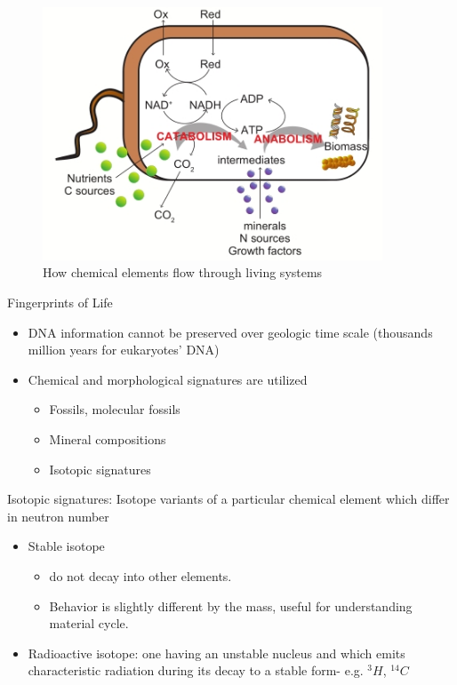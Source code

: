 \documentclass[]{article}
\begin{document}
\begin{figure}[H]
	\caption{How chemical elements flow through living systems}\label{fig:Biogeochemistry}
	\includegraphics[width=0.9\textwidth]{Biogeochemistry}
\end{figure}

Fingerprints of Life
\begin{itemize}
	\item  DNA information cannot be preserved over geologic time
	scale (thousands ~ million years for eukaryotes' DNA)
	\item Chemical and morphological signatures are utilized
	\begin{itemize}
		\item  Fossils, molecular fossils
		\item Mineral compositions
		\item Isotopic signatures
	\end{itemize}
\end{itemize}

Isotopic signatures: Isotope variants of a particular chemical element
which differ in neutron number
\begin{itemize}
	\item  Stable isotope
	\begin{itemize}
		\item do not decay into other
		elements.
		\item Behavior is slightly different by the
		mass, useful for understanding
		material cycle.
	\end{itemize}
	\item Radioactive isotope: one having an unstable nucleus and
	which emits characteristic radiation during
	its decay to a stable form- e.g. $^3H$, $^14C$
\end{itemize}
\end{document}
